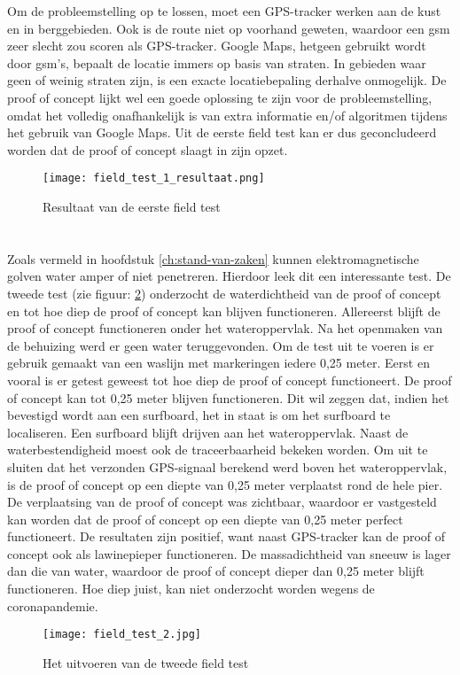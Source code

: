 Om de probleemstelling op te lossen, moet een GPS-tracker werken aan de kust en in berggebieden. Ook is de route niet op voorhand geweten, waardoor een gsm zeer slecht zou scoren als GPS-tracker. Google Maps, hetgeen gebruikt wordt door gsm's, bepaalt de locatie immers op basis van straten. In gebieden waar geen of weinig straten zijn, is een exacte locatiebepaling derhalve onmogelijk. De proof of concept lijkt wel een goede oplossing te zijn voor de probleemstelling, omdat het volledig onafhankelijk is van extra informatie en/of algoritmen tijdens het gebruik van Google Maps. 
\newline
Uit de eerste field test kan er dus geconcludeerd worden dat de proof of concept slaagt in zijn opzet.
\begin{figure}
	\texttt{[image: field\_test\_1\_resultaat.png]}
	\caption{Resultaat van de eerste field test}
	\label{fig:field_test_1_resultaat}
\end{figure}
\section{}
Zoals vermeld in hoofdstuk \ref{ch:stand-van-zaken} kunnen elektromagnetische golven water amper of niet penetreren. Hierdoor leek dit een interessante test.
\newline
De tweede test (zie figuur: \ref{fig:field_test_2}) onderzocht de waterdichtheid van de proof of concept en tot hoe diep de proof of concept kan blijven functioneren. Allereerst blijft de proof of concept functioneren onder het wateroppervlak. Na het openmaken van de behuizing werd er geen water teruggevonden. Om de test uit te voeren is er gebruik gemaakt van een waslijn met markeringen iedere 0,25 meter. 
\newline
Eerst en vooral is er getest geweest tot hoe diep de proof of concept functioneert. De proof of concept kan tot 0,25 meter blijven functioneren. Dit wil zeggen dat, indien het bevestigd wordt aan een surfboard, het in staat is om het surfboard te localiseren. Een surfboard blijft drijven aan het wateroppervlak. Naast de waterbestendigheid moest ook de traceerbaarheid bekeken worden. Om uit te sluiten dat het verzonden GPS-signaal berekend werd boven het wateroppervlak, is de proof of concept op een diepte van 0,25 meter verplaatst rond de hele pier. De verplaatsing van de proof of concept was zichtbaar, waardoor er vastgesteld kan worden dat de proof of concept op een diepte van 0,25 meter perfect functioneert. 
\newline
De resultaten zijn positief, want naast GPS-tracker kan de proof of concept ook als lawinepieper functioneren. De massadichtheid van sneeuw is lager dan die van water, waardoor de proof of concept dieper dan 0,25 meter blijft functioneren. Hoe diep juist, kan niet onderzocht worden wegens de coronapandemie. 
\begin{figure}
	\texttt{[image: field\_test\_2.jpg]}
	\caption{Het uitvoeren van de tweede field test}
	\label{fig:field_test_2}
\end{figure}